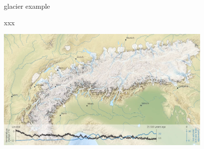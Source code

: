 \documentclass[svgnames,
               hyperref={colorlinks,citecolor=DeepPink4,linkcolor=FireBrick,urlcolor=Maroon},
               usepdftitle=false]  %
               {beamer}
\begin{document}
\begin{frame}{glacier example}

xxx

\includegraphics[width=0.8\textwidth]{images/alps-seguinot2018.png}
\end{frame}
\end{document}
